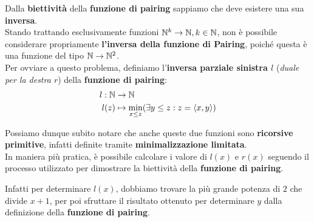 Dalla \textbf{biettività} della \textbf{funzione di pairing} sappiamo che deve esistere una sua \textbf{inversa}.\\
Stando trattando esclusivamente funzioni \(\mathbb{N}^k\rightarrow\mathbb{N}, k \in \mathbb{N}\), non è possibile considerare propriamente \textbf{l'inversa della funzione di Pairing}, poiché questa è una funzione del tipo \(\mathbb{N}\rightarrow\mathbb{N}^2\).\\
Per ovviare a questo problema, definiamo l'\textbf{inversa parziale sinistra \(l\)} (\textit{duale per la destra \(r\)}) della \textbf{funzione di pairing}:
\begin{equation}
  \begin{split}
    l:\mathbb{N}&\rightarrow\mathbb{N}\\
    l(z) &\mapsto \min_{x\leq z}(\exists y \leq z: z= \displaystyle{\left\langle{ x,y }\right\rangle})\\
  \end{split}
\end{equation}

Possiamo dunque subito notare che anche queste due funzioni sono \textbf{ricorsive primitive}, infatti definite tramite \textbf{minimalizzazione limitata}.\\
In maniera più pratica, è possibile  calcolare i valore di \(l(x)\) e \(r(x)\) seguendo il processo utilizzato per dimostrare la biettività della \textbf{funzione di pairing}.

Infatti per determinare \(l(x)\), dobbiamo trovare la più grande potenza di \(2\) che divide \(x+1\), per poi sfruttare il risultato ottenuto per determinare \(y\) dalla definizione della \textbf{funzione di pairing}.
\newpage

